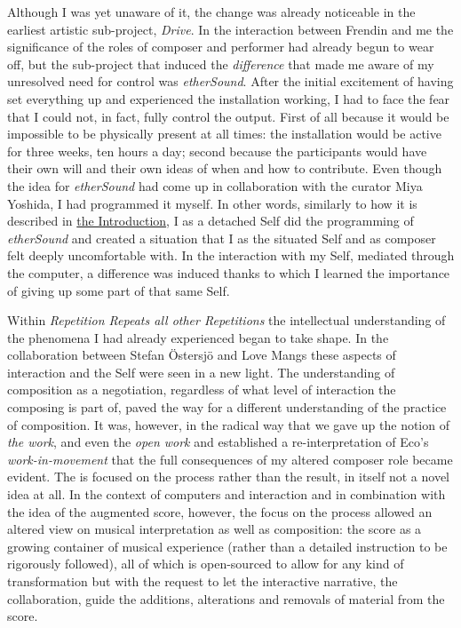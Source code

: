%
Although I was yet unaware of it, the change was already noticeable in the earliest artistic sub-project, \emph{Drive}. In the interaction between Frendin and me the significance of the roles of composer and performer had already begun to wear off, but the sub-project that induced the \emph{difference} that made me aware of my unresolved need for control was \emph{etherSound}. After the initial excitement of having set everything up and experienced the installation working, I had to face the fear that I could not, in fact, fully control the output. First of all because it would be impossible to be physically present at all times: the installation would be active for three weeks, ten hours a day; second because the participants would have their own will and their own ideas of when and how to contribute. Even though the idea for \emph{etherSound} had come up in collaboration with the curator Miya Yoshida, I had programmed it myself. In other words, similarly to how it is described in \hyperlink{sec:target:overview-1}{the Introduction}, I as a detached Self did the programming of \emph{etherSound} and created a situation that I as the situated Self and as composer felt deeply uncomfortable with. In the interaction with my Self, mediated through the computer, a difference was induced thanks to which I learned the importance of giving up some part of that same Self. 

%
Within \emph{Repetition Repeats all other Repetitions} the intellectual understanding of the phenomena I had already experienced began to take shape. In the collaboration between Stefan \"{O}stersj\"{o} and Love Mangs these aspects of interaction and the Self were seen in a new light. The understanding of composition as a negotiation, regardless of what level of interaction the composing is part of, paved the way for a different understanding of the practice of composition. It was, however, in the radical way that we gave up the notion of \emph{the work}, and even the \emph{open work} and established a re-interpretation of Eco's \emph{work-in-movement} that the full consequences of my altered composer role became evident. The  is focused on the process rather than the result, in itself not a novel idea at all. In the context of computers and interaction and in combination with the idea of the augmented score, however, the focus on the process allowed an altered view on musical interpretation as well as composition: the score as a growing container of musical experience (rather than a detailed instruction to be rigorously followed), all of which is open-sourced to allow for any kind of transformation but with the request to let the interactive narrative, the collaboration, guide the additions, alterations and removals of material from the score.

